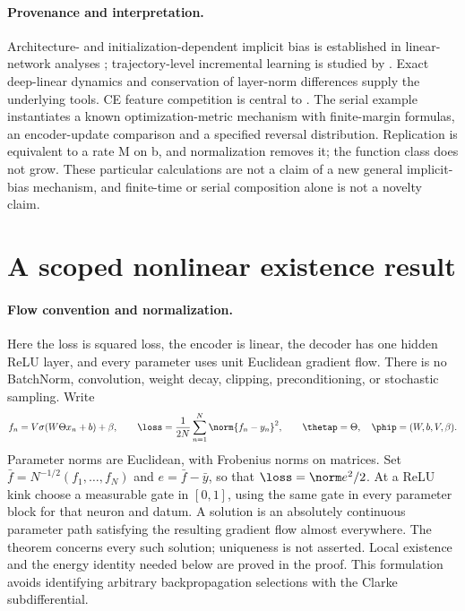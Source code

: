 \paragraph{Provenance and interpretation.}
Architecture- and initialization-dependent implicit bias is established
in linear-network analyses \citep{astra_yun2021,astra_moroshko2020};
trajectory-level incremental learning is studied by
\citet{astra_berthier2023}. Exact deep-linear dynamics
\citep{astra_saxe2014} and conservation of layer-norm differences
\citep{astra_du2018balance} supply the underlying tools. CE feature
competition is central to \citet{astra_pezeshki2021}.
The serial example instantiates a known optimization-metric mechanism
with finite-margin formulas, an encoder-update comparison and a specified
reversal distribution. Replication is equivalent to a rate M on b,
and normalization removes it; the function class does not grow.
These particular calculations are not a claim of a new general implicit-bias
mechanism, and finite-time or serial composition alone is not a novelty claim.

\section{A scoped nonlinear existence result}
\label{sec:astra_nonlinear}

\paragraph{Flow convention and normalization.}
Here the loss is squared loss, the encoder is linear, the decoder has
one hidden ReLU layer, and every parameter uses unit Euclidean gradient
flow. There is no BatchNorm, convolution, weight decay, clipping,
preconditioning, or stochastic sampling. Write
\[
 f_n=V\sigma(W\Theta x_n+b)+\beta,\qquad
 \loss=\frac1{2N}\sum_{n=1}^N\norm{f_n-y_n}^2,
 \qquad \thetap=\Theta,\quad\phip=(W,b,V,\beta).
\]
Parameter norms are Euclidean, with Frobenius norms on matrices.
Set $\bar f=N^{-1/2}(f_1,\ldots,f_N)$ and
$e=\bar f-\bar y$, so that $\loss=\norm e^2/2$.
At a ReLU kink choose a measurable gate in $[0,1]$, using the same gate
in every parameter block for that neuron and datum. A solution is an
absolutely continuous parameter path satisfying the resulting gradient
flow almost everywhere. The theorem concerns every such solution;
uniqueness is not asserted. Local existence and the energy identity
needed below are proved in the proof. This formulation avoids identifying
arbitrary backpropagation selections with the Clarke subdifferential.

